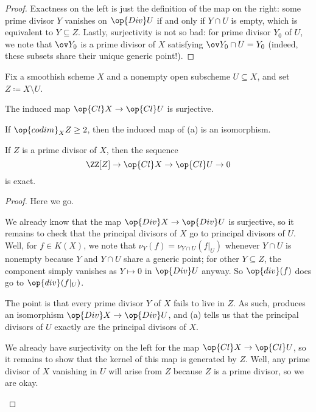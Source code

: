 \documentclass[../notes.tex]{subfiles}
\begin{document}
\begin{proof}
	Exactness on the left is just the definition of the map on the right: some prime divisor $Y$ vanishes on $\op{Div}U$ if and only if $Y\cap U$ is empty, which is equivalent to $Y\subseteq Z$. Lastly, surjectivity is not so bad: for prime divisor $Y_0$ of $U$, we note that $\ov Y_0$ is a prime divisor of $X$ satisfying $\ov Y_0\cap U=Y_0$ (indeed, these subsets share their unique generic point!).
\end{proof}
\begin{proposition}
	Fix a smoothish scheme $X$ and a nonempty open subscheme $U\subseteq X$, and set $Z\coloneqq X\setminus U$.
	\begin{listalph}
		\item The induced map $\op{Cl}X\to\op{Cl}U$ is surjective.
		\item If $\op{codim}_XZ\ge2$, then the induced map of (a) is an isomorphism.
		\item If $Z$ is a prime divisor of $X$, then the sequence
		\[\ZZ[Z]\to\op{Cl}X\to\op{Cl}U\to0\]
		is exact.
	\end{listalph}
\end{proposition}
\begin{proof}
	Here we go.
	\begin{listalph}
		\item We already know that the map $\op{Div}X\to\op{Div}U$ is surjective, so it remains to check that the principal divisors of $X$ go to principal divisors of $U$. Well, for $f\in K(X)$, we note that $\nu_Y(f)=\nu_{Y\cap U}(f|_U)$ whenever $Y\cap U$ is nonempty because $Y$ and $Y\cap U$ share a generic point; for other $Y\subseteq Z$, the component simply vanishes as $Y\mapsto0$ in $\op{Div}U$ anyway. So $\op{div}(f)$ does go to $\op{div}(f|_U)$.
		\item The point is that every prime divisor $Y$ of $X$ fails to live in $Z$. As such,  produces an isomorphism $\op{Div}X\to\op{Div}U$, and (a) tells us that the principal divisors of $U$ exactly are the principal divisors of $X$.
		\item We already have surjectivity on the left for the map $\op{Cl}X\to\op{Cl}U$, so it remains to show that the kernel of this map is generated by $Z$. Well, any prime divisor of $X$ vanishing in $U$ will arise from $Z$ because $Z$ is a prime divisor, so we are okay.
		\qedhere
	\end{listalph}
\end{proof}
\end{document}
